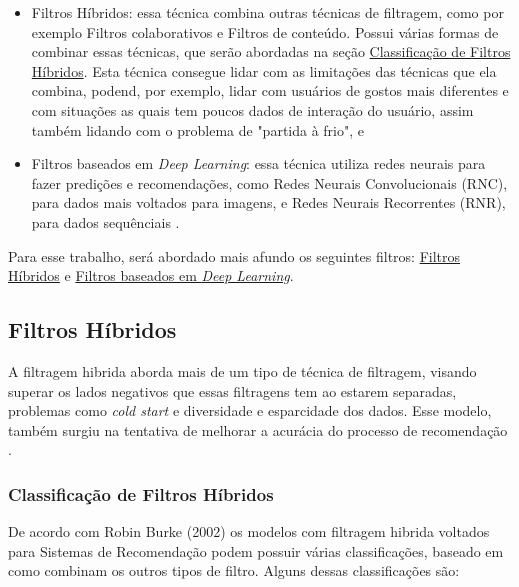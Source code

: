 \begin{itemize}
\item Filtros Híbridos: essa técnica combina outras técnicas de filtragem, como por exemplo Filtros colaborativos e Filtros
de conteúdo. Possui várias formas de combinar essas técnicas, que serão abordadas na seção 
\hyperref[subsubsec:tiposfh]{Classificação de Filtros Híbridos}. Esta técnica consegue lidar com as limitações das técnicas que 
ela combina, podend, por exemplo, lidar com usuários de gostos mais diferentes e com situações as quais
tem poucos dados de interação do usuário, assim também lidando com o problema de 
"partida à frio"\cite{stratoflow-recommendation}, e 

\item Filtros baseados em \textit{Deep Learning}: essa técnica utiliza redes neurais para fazer predições e recomendações, 
como Redes Neurais Convolucionais (RNC), para dados mais voltados para imagens, e Redes Neurais Recorrentes (RNR), para dados
sequênciais \cite{nvidia-recommendation}.
\end{itemize}

Para esse trabalho, será abordado mais afundo os seguintes filtros:
\hyperref[subsec:hibridos]{Filtros Híbridos} e \hyperref[subsec:filtrodeep]{Filtros baseados em \textit{Deep Learning}}.

\subsection{Filtros Híbridos}\label{subsec:hibridos}
A filtragem hibrida aborda mais de um tipo de técnica de filtragem, visando superar os lados negativos que essas filtragens
tem ao estarem separadas, problemas como \textit{cold start} e diversidade e esparcidade dos dados. Esse modelo, também surgiu
na tentativa de melhorar a acurácia do processo de recomendação \cite{thorat2015survey}.

\subsubsection{Classificação de Filtros Híbridos}\label{subsubsec:tiposfh}
De acordo com Robin Burke (2002) os modelos com filtragem hibrida voltados para Sistemas de Recomendação podem possuir
várias classificações, baseado em como combinam os outros tipos de filtro. Alguns dessas classificações são:

